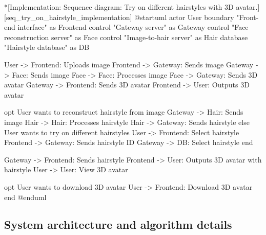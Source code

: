 \begin{umlfigure}*[Implementation: Sequence diagram: Try on different hairstyles with 3D avatar.][seq_try_on_hairstyle_implementation]
    @startuml
    actor User
    boundary "Front-end interface" as Frontend
    control "Gateway server" as Gateway
    control "Face reconstruction server" as Face
    control "Image-to-hair server" as Hair
    database "Hairstyle database" as DB

    User -> Frontend: Uploads image
    Frontend -> Gateway: Sends image
    Gateway -> Face: Sends image
    Face -> Face: Processes image
    Face -> Gateway: Sends 3D avatar
    Gateway -> Frontend: Sends 3D avatar
    Frontend -> User: Outputs 3D avatar


    opt User wants to reconstruct hairstyle from image
    Gateway -> Hair: Sends image
    Hair -> Hair: Processes hairstyle
    Hair -> Gateway: Sends hairstyle
    else User wants to try on different hairstyles
    User -> Frontend: Select hairstyle
    Frontend -> Gateway: Sends hairstyle ID
    Gateway -> DB: Select hairstyle
    end



    Gateway -> Frontend: Sends hairstyle
    Frontend -> User: Outputs 3D avatar with hairstyle
    User -> User: View 3D avatar

    opt User wants to download 3D avatar
    User -> Frontend: Download 3D avatar
    end
    @enduml
\end{umlfigure}

\clearpage

\subsection{System architecture and algorithm details}



